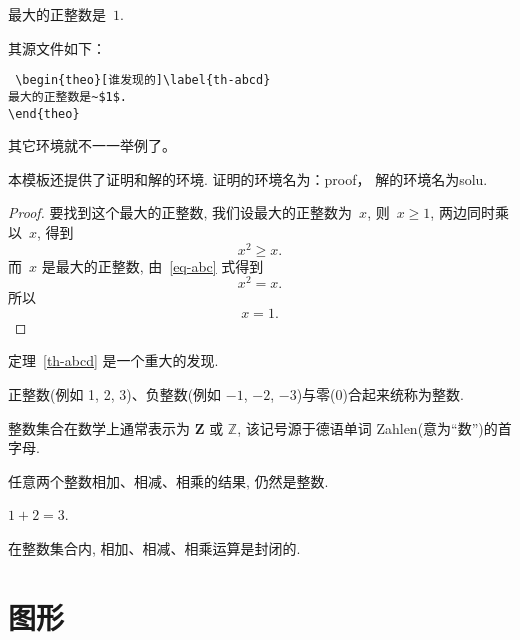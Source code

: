 \begin{theo}[谁发现的]\label{th-abcd}
  最大的正整数是~$1$.
\end{theo}

其源文件如下：

\begin{lstlisting}
 \begin{theo}[谁发现的]\label{th-abcd}
最大的正整数是~$1$.
\end{theo}
\end{lstlisting}

其它环境就不一一举例了。

本模板还提供了证明和解的环境. 证明的环境名为：proof， 解的环境名为solu.

\begin{proof}
  要找到这个最大的正整数, 我们设最大的正整数为~$x$, 则~$x \geqslant 1$, 两边同时乘以~$x$, 得到
  \begin{equation}\label{eq-abc}
    x^2 \geqslant x.
  \end{equation}
  而~$x$ 是最大的正整数, 由~\ref{eq-abc} 式得到
  \[
    x^2 = x.
  \]
  所以
  \begin{equation*}
    x = 1.
  \end{equation*}
\end{proof}

定理~\ref{th-abcd} 是一个重大的发现.

\begin{defi}[整数]
  正整数(例如 1, 2, 3)、负整数(例如 ${-1}$, $-2$, $-3$)与零(0)合起来统称为{\heiti 整数}.
\end{defi}

\begin{rema}
  整数集合在数学上通常表示为 $\mathbf{Z}$ 或 $\mathbb{Z}$, 该记号源于德语单词 Zahlen(意为``数'')的首字母.
\end{rema}

\begin{prop}
  任意两个整数相加、相减、相乘的结果, 仍然是整数.
\end{prop}

\begin{exam}
  $1+2=3$.
\end{exam}

\begin{coro}
  在整数集合内, 相加、相减、相乘运算是封闭的.
\end{coro}

\section{图形}

